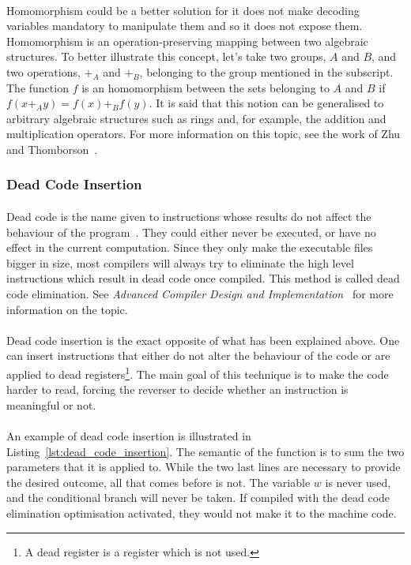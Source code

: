 \paragraph{}
Homomorphism could be a better solution for it does not make decoding variables mandatory to manipulate them and so it does not expose them. Homomorphism is an operation-preserving mapping between two algebraic structures. To better illustrate this concept, let's take two groups, $A$ and $B$, and two operations, $+_A$ and $+_B$, belonging to the group mentioned in the subscript. The function $f$ is an homomorphism between the sets belonging to $A$ and $B$ if $f(x+_Ay) = f(x)+_Bf(y)$. It is said that this notion can be generalised to arbitrary algebraic structures such as rings and, for example, the addition and multiplication operators. For more information on this topic, see the work of Zhu and Thomborson~\cite{zhu2005provable}.

\subsubsection{Dead Code Insertion}

\paragraph{}
Dead code is the name given to instructions whose results do not affect the behaviour of the program~\cite{debray2000compiler}. They could either never be executed, or have no effect in the current computation. Since they only make the executable files bigger in size, most compilers will always try to eliminate the high level instructions which result in dead code once compiled. This method is called dead code elimination. See \textit{Advanced Compiler Design and Implementation}~\cite{steven1997advanced} for more information on the topic.

\paragraph{}
Dead code insertion is the exact opposite of what has been explained above. One can insert instructions that either do not alter the behaviour of the code or are applied to dead registers\footnote{A dead register is a register which is not used.}. The main goal of this technique is to make the code harder to read, forcing the reverser to decide whether an instruction is meaningful or not.

\paragraph{}
An example of dead code insertion is illustrated in Listing~\ref{lst:dead_code_insertion}. The semantic of the function is to sum the two parameters that it is applied to. While the two last lines are necessary to provide the desired outcome, all that comes before is not. The variable $w$ is never used, and the conditional branch will never be taken. If compiled with the dead code elimination optimisation activated, they would not make it to the machine code.\\


